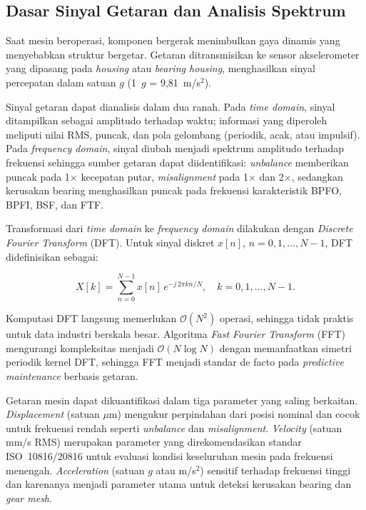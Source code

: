 
{\color{blue}
\subsection{Dasar Sinyal Getaran dan Analisis Spektrum}
\label{subsec:bab3_sinyal_getaran}

Saat mesin beroperasi, komponen bergerak menimbulkan gaya dinamis yang
menyebabkan struktur bergetar. Getaran ditransmisikan ke sensor akselerometer
yang dipasang pada \emph{housing} atau \emph{bearing housing}, menghasilkan sinyal percepatan
dalam satuan $g$ (1~$g$ = 9{,}81~m/s$^2$).

Sinyal getaran dapat dianalisis dalam dua ranah. Pada \emph{time domain},
sinyal ditampilkan sebagai amplitudo terhadap waktu; informasi yang diperoleh
meliputi nilai RMS, puncak, dan pola gelombang (periodik, acak, atau impulsif).
Pada \emph{frequency domain}, sinyal diubah menjadi spektrum amplitudo terhadap
frekuensi sehingga sumber getaran dapat diidentifikasi: \emph{unbalance}
memberikan puncak pada 1$\times$ kecepatan putar, \emph{misalignment} pada
1$\times$ dan 2$\times$, sedangkan kerusakan bearing menghasilkan puncak pada
frekuensi karakteristik BPFO, BPFI, BSF, dan FTF.

Transformasi dari \emph{time domain} ke \emph{frequency domain} dilakukan
dengan \emph{Discrete Fourier Transform} (DFT). Untuk sinyal diskret
$x[n]$, $n = 0, 1, \ldots, N-1$, DFT didefinisikan sebagai:
}

{\color{blue}
\begin{equation*}
  X[k] = \sum_{n=0}^{N-1} x[n]\, e^{-j\,2\pi k n / N},
  \quad k = 0, 1, \ldots, N-1.
\end{equation*}
}

{\color{blue}
Komputasi DFT langsung memerlukan $\mathcal{O}(N^2)$ operasi, sehingga tidak
praktis untuk data industri berskala besar. Algoritma \emph{Fast Fourier
Transform} (FFT) mengurangi kompleksitas menjadi $\mathcal{O}(N \log N)$
dengan memanfaatkan simetri periodik kernel DFT, sehingga FFT menjadi standar
de facto pada \emph{predictive maintenance} berbasis getaran.

Getaran mesin dapat dikuantifikasi dalam tiga parameter yang saling berkaitan.
\emph{Displacement} (satuan $\mu$m) mengukur perpindahan dari posisi nominal
dan cocok untuk frekuensi rendah seperti \emph{unbalance} dan \emph{misalignment}.
\emph{Velocity} (satuan mm/s RMS) merupakan parameter yang direkomendasikan
standar ISO~10816/20816 untuk evaluasi kondisi keseluruhan mesin pada
frekuensi menengah. \emph{Acceleration} (satuan $g$ atau m/s$^2$) sensitif
terhadap frekuensi tinggi dan karenanya menjadi parameter utama untuk deteksi
kerusakan bearing dan \emph{gear mesh}.
}

